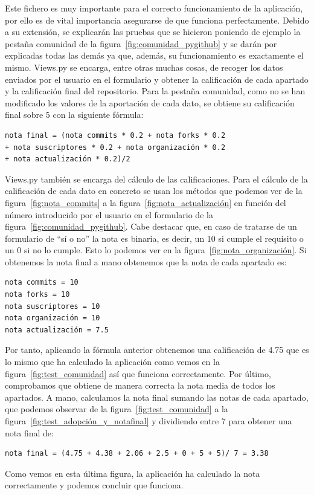 \documentclass[a4paper, 12pt]{book}
\begin{document}
Este fichero es muy importante para el correcto funcionamiento de la aplicación, por ello es de vital importancia asegurarse de que funciona perfectamente. Debido a su extensión, se explicarán las pruebas que se hicieron poniendo de ejemplo la pestaña comunidad de la figura~\ref{fig:comunidad_pygithub} y se darán por explicadas todas las demás ya que, además, su funcionamiento es exactamente el mismo.
Views.py se encarga, entre otras muchas cosas, de recoger los datos enviados por el usuario en el formulario y obtener la calificación de cada apartado y la calificación final del repositorio. Para la pestaña comunidad, como no se han modificado los valores de la aportación de cada dato, se obtiene su calificación final sobre 5 con la siguiente fórmula:
\begin{verbatim}
nota final = (nota commits * 0.2 + nota forks * 0.2
+ nota suscriptores * 0.2 + nota organización * 0.2 
+ nota actualización * 0.2)/2
\end{verbatim}

Views.py también se encarga del cálculo de las calificaciones. Para el cálculo de la calificación de cada dato en concreto se usan los métodos que podemos ver de la figura~\ref{fig:nota_commits} a la figura~\ref{fig:nota_actualización} en función del número introducido por el usuario en el formulario de la figura~\ref{fig:comunidad_pygithub}. Cabe destacar que, en caso de tratarse de un formulario de ``sí o no'' la nota es binaria, es decir, un 10 si cumple el requisito o un 0 si no lo cumple. Esto lo podemos ver en la figura~\ref{fig:nota_organización}.
Si obtenemos la nota final a mano obtenemos que la nota de cada apartado es:
\begin{verbatim}
nota commits = 10
nota forks = 10
nota suscriptores = 10
nota organización = 10
nota actualización = 7.5
\end{verbatim}
Por tanto, aplicando la fórmula anterior obtenemos una calificación de 4.75 que es lo mismo que ha calculado la aplicación como vemos en la figura~\ref{fig:test_comunidad} así que funciona correctamente. Por último, comprobamos que obtiene de manera correcta la nota media de todos los apartados. A mano, calculamos la nota final sumando las notas de cada apartado, que podemos observar de la figura~\ref{fig:test_comunidad} a la figura~\ref{fig:test_adopción_y_notafinal} y dividiendo entre 7 para obtener una nota final de:
\begin{verbatim}
nota final = (4.75 + 4.38 + 2.06 + 2.5 + 0 + 5 + 5)/ 7 = 3.38
\end{verbatim}
Como vemos en esta última figura, la aplicación ha calculado la nota correctamente y podemos concluir que funciona.
\end{document}

